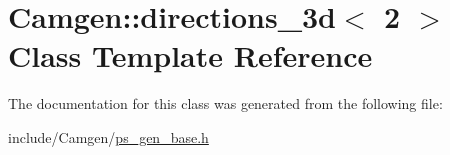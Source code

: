 \hypertarget{a00134}{}\section{Camgen\+:\+:directions\+\_\+3d$<$ 2 $>$ Class Template Reference}
\label{a00134}


The documentation for this class was generated from the following file\+:\begin{DoxyCompactItemize}
\item 
include/\+Camgen/\hyperlink{a00743}{ps\+\_\+gen\+\_\+base.\+h}\end{DoxyCompactItemize}
